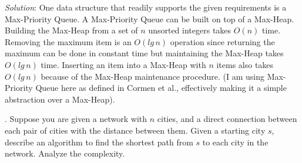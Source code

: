 \documentclass{scrartcl}
\begin{document}
    \noindent
    \textit{Solution}: One data structure that readily supports the given requirements is a
    Max-Priority Queue. A Max-Priority Queue can be built on top of a Max-Heap. Building the
    Max-Heap from a set of $n$ unsorted integers takes $O(n)$ time. Removing the maximum item is an
    $O(lg\,n)$ operation since returning the maximum can be done in constant time but maintaining
    the Max-Heap takes $O(lg\,n)$ time. Inserting an item into a Max-Heap with $n$ items also takes
    $O(lg\,n)$ because of the Max-Heap maintenance procedure. (I am using Max-Priority Queue here as
    defined in Cormen et al., effectively making it a simple abstraction over a Max-Heap).

    \newpage
    . Suppose you are given a network with $n$ cities, and a direct connection between each pair of
    cities with the distance between them. Given a starting city $s$, describe an algorithm to find
    the shortest path from $s$ to each city in the network. Analyze the complexity.
\end{document}
